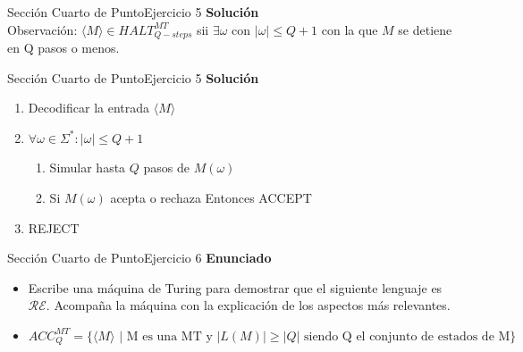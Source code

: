 \documentclass[10pt, envcountsect, presentation, aspectratio=169]{beamer}
\newcommand{\lr}{\ensuremath{\mathcal {RE}}}
\begin{document}

\begin{frame}{Sección Cuarto de Punto}{Ejercicio 5}
    \textbf{Solución}\\
    Observación: $\langle M \rangle \in HALT_{Q-steps}^{MT}$ sii $\exists \omega \text{ con } | \omega | \leq Q+1$ con la que $M$ se detiene en Q pasos o menos.\\
\end{frame}


\begin{frame}{Sección Cuarto de Punto}{Ejercicio 5}
    \textbf{Solución}\\
    \begin{enumerate}
        \item Decodificar la entrada $\langle M \rangle$
        \item $\forall \omega \in \Sigma^* : |\omega| \leq Q+1$
        \begin{enumerate}
            \item Simular hasta $Q$ pasos de $M(\omega)$
            \item Si $M(\omega)$ acepta o rechaza Entonces ACCEPT
        \end{enumerate}
        \item REJECT
    \end{enumerate}
\end{frame}


\begin{frame}{Sección Cuarto de Punto}{Ejercicio 6}
\textbf{Enunciado}
	\begin{itemize}
        \item Escribe una máquina de Turing para demostrar que el siguiente lenguaje es $\lr$. Acompaña la máquina con la explicación de los aspectos más relevantes. 
        \item[] $$ACC_{Q}^{MT}=\{\langle M \rangle \mbox{ | M es una MT y } |L(M)| \geq |Q| \mbox{ siendo Q el conjunto de estados de M}\}$$
    \end{itemize}
\end{frame}

\end{document}
